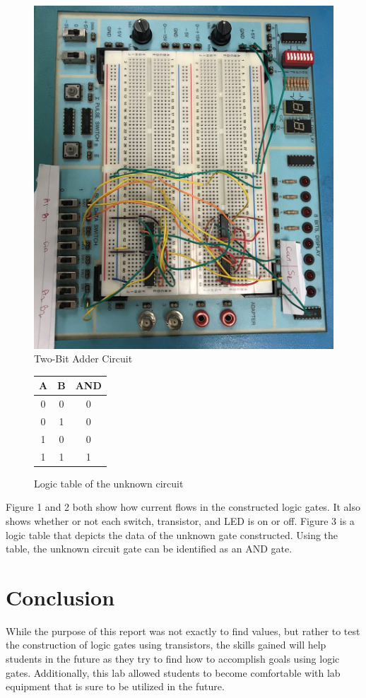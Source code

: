 \documentclass[11pt]{article}
\begin{document}
\begin{figure}
	\includegraphics[width=1.0\textwidth]{"TWO-BITADDER"}
	\caption{Two-Bit Adder Circuit}
\end{figure}

\begin{figure}[ht]\centering
	\begin{tabular}{cc|c}
		\toprule
		A & B & AND \\
		\midrule
		0 & 0 & 0 \\
		0 & 1 & 0 \\
		1 & 0 & 0 \\
		1 & 1 & 1 \\
		\bottomrule
	\end{tabular} 
	
	\caption{Logic table of the unknown circuit}
	
\end{figure}


Figure 1 and 2 both show how current flows in the constructed logic gates. It also shows whether or not each switch, transistor, and LED is on or off. Figure 3 is a logic table that depicts the data of the unknown gate constructed. Using the table, the unknown circuit gate can be identified as an AND gate.
\clearpage
\section*{Conclusion}

While the purpose of this report was not exactly to find values, but rather to test the construction of logic gates using transistors, the skills gained will help students in the future as they try to find how to accomplish goals using logic gates. Additionally, this lab allowed students to become comfortable with lab equipment that is sure to be utilized in the future.
\end{document}
